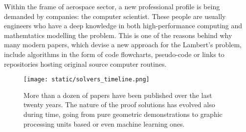 Within the frame of aerospace sector, a new professional profile is being
demanded by companies: the computer scientist. These people are usually
engineers who have a deep knowledge in both high-performance computing and
mathemtatics modelling the problem. This is one of the reasons behind why many
modern papers, which devise a new approach for the Lambert's problem, include
algorithms in the form of code flowcharts, pseudo-code or links to repositories
hosting original source computer routines.

\begin{figure}[h]
  \centering
  \texttt{[image: static/solvers\_timeline.png]}
  \caption[Publications related with Lamebert's problem.]{More than a dozen of papers have been published over the last twenty
    years. The nature of the proof solutions has evolved also during time, going
    from pure geometric demonstrations to graphic processing units based or even machine
    learning ones.}
  \label{fig:art_lambert}
\end{figure}

